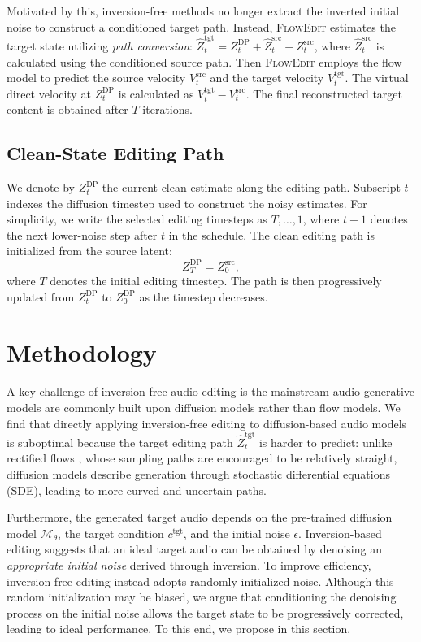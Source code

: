 Motivated by this, inversion-free methods no longer extract the inverted initial noise to construct a conditioned target path. Instead, \textsc{FlowEdit} estimates the target state utilizing \textit{path conversion}: $\hat{Z}^{\text{tgt}}_t =  Z^{\text{DP}}_t + \hat{Z}^{\text{src}}_t - Z^{\text{src}}_t$, where $\hat{Z}^{\text{src}}_t$ is calculated using the conditioned source path.
Then \textsc{FlowEdit} employs the flow model to predict the source velocity $V^{\text{src}}_t$ and the target velocity $V^{\text{tgt}}_t$. The virtual direct velocity at $Z^{\text{DP}}_t$ is calculated as $V^{\text{tgt}}_t-V^{\text{src}}_t$. The final reconstructed target content is obtained after $T$ iterations.

\subsection{Clean-State Editing Path}

We denote by $Z_t^{\text{DP}}$ the current clean estimate along the editing path.
Subscript $t$ indexes the diffusion timestep used to construct the noisy estimates.
For simplicity, we write the selected editing timesteps as $T,\ldots,1$, where $t-1$ denotes the next lower-noise step after $t$ in the schedule.
The clean editing path is initialized from the source latent:
\begin{equation}
Z_T^{\text{DP}} = Z^{\text{src}}_0,
\end{equation}
where $T$ denotes the initial editing timestep.
The path is then progressively updated from $Z_t^{\text{DP}}$ to $Z_0^{\text{DP}}$ as the timestep decreases.

\section{Methodology}

A key challenge of inversion-free audio editing is the mainstream audio generative models are commonly built upon diffusion models rather than flow models. We find that directly applying inversion-free editing to diffusion-based audio models is suboptimal because the target editing path $\hat{Z}^{\text{tgt}}_t$ is harder to predict: unlike rectified flows \citep{liu2023flow}, whose sampling paths are encouraged to be relatively straight, diffusion models describe generation through stochastic differential equations (SDE), leading to more curved and uncertain paths. 

Furthermore, the generated target audio depends on the pre-trained diffusion model $\mathcal{M}_\theta$, the target condition $c^{\text{tgt}}$, and the initial noise $\epsilon$. Inversion-based editing suggests that an ideal target audio can be obtained by denoising an \textit{appropriate initial noise} derived through inversion. 
To improve efficiency, inversion-free editing instead adopts randomly initialized noise. 
Although this random initialization may be biased, we argue that conditioning the denoising process on the initial noise allows the target state to be progressively corrected, leading to ideal performance.
To this end, we propose \ourmethod{} in this section.

